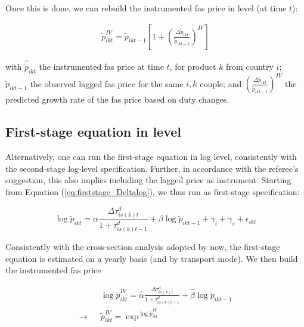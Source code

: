\documentclass[a4paper,12pt]{article}
\begin{document}
Once this is done, we can rebuild the instrumented fas price in level (at time $t$):

\begin{eqnarray*}
\widetilde{p}^{IV}_{ikt} = \widetilde{p}_{ikt-1}\left[1 + \left(\frac{\Delta \widetilde{p}_{ikt}}{\widetilde{p}_{ikt-1}}\right)^{IV}\right]
\end{eqnarray*}

with $\widehat{\widetilde{p}}_{ikt}$ the instrumented fas price at time $t$, for product $k$ from country $i$; $\widetilde{p}_{ikt-1}$ the observed lagged fas price for the same $i,k$ couple; and $ \left(\frac{\Delta \widetilde{p}_{ikt}}{\widetilde{p}_{ikt-1}}\right)^{IV}$ the predicted growth rate of the fas price based on duty changes.

\subsection{First-stage equation in level}

Alternatively, one can run the first-stage equation in log level, consistently with the second-stage log-level specification. Further, in accordance with the referee's suggestion, this also implies including the lagged price as instrument. Starting from Equation (\ref{eq:firststage_Deltalog}), we thus run as first-stage specification:


\begin{equation}
\log \widetilde{p}_{ikt} = \alpha\frac{\Delta \tau^d_{is(k)t}}{1+\tau_{is(k)t-1}^d} + \beta \log\widetilde{p}_{ikt-1}  +\gamma_{i} +\gamma_{s}+\epsilon_{ikt} \label{eq:firststage_log}
\end{equation}

Consistently with the cross-section analysis adopted by now, the first-stage equation is estimated on a yearly basis (and by transport mode). We then build the instrumented fas price

\begin{eqnarray*}
&&\log \widetilde{p}_{ikt}^{IV} = \widehat{\alpha}\frac{\Delta \tau^d_{is(k)t}}{1+\tau_{is(k)t-1}^d} + \widehat{\beta}\log\widetilde{p}_{ikt-1} \\
\rightarrow &&\widetilde{p}_{ikt}^{IV}  = \exp^{\log \widetilde{p}_{ikt}^{IV}}
\end{eqnarray*}
\end{document}
